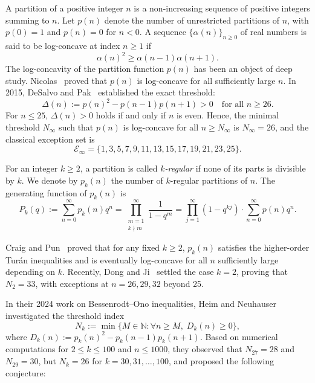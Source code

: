 \documentclass[11pt,reqno]{amsart}
\theoremstyle{definition}
\numberwithin{equation}{section}
\begin{document}
A partition of a positive integer $n$ is a non-increasing sequence of positive integers summing to $n$. Let $p(n)$ denote the number of unrestricted partitions of $n$, with $p(0) = 1$ and $p(n) = 0$ for $n < 0$. A sequence $\{\alpha(n)\}_{n \ge 0}$ of real numbers is said to be log-concave at index $n \ge 1$ if
\begin{equation}
\alpha(n)^2 \ge \alpha(n-1) \alpha(n+1).
\end{equation}
The log-concavity of the partition function $p(n)$ has been an object of deep study. Nicolas~\cite{Nicolas1978} proved that $p(n)$ is log-concave for all sufficiently large $n$. In 2015, DeSalvo and Pak~\cite{DeSalvoPak2015} established the exact threshold:
\begin{equation}
\Delta(n) := p(n)^2 - p(n-1) p(n+1) > 0 \quad \text{for all } n \ge 26.
\end{equation}
For $n \le 25$, $\Delta(n) > 0$ holds if and only if $n$ is even. Hence, the minimal threshold $N_\infty$ such that $p(n)$ is log-concave for all $n \ge N_\infty$ is $N_\infty = 26$, and the classical exception set is
\begin{equation}
\mathcal{E}_\infty = \{1, 3, 5, 7, 9, 11, 13, 15, 17, 19, 21, 23, 25\}.
\end{equation}

For an integer $k \ge 2$, a partition is called \emph{$k$-regular} if none of its parts is divisible by $k$. We denote by $p_k(n)$ the number of $k$-regular partitions of $n$. The generating function of $p_k(n)$ is
\begin{equation}
P_k(q) := \sum_{n=0}^\infty p_k(n) q^n = \prod_{\substack{m=1 \\ k \nmid m}}^\infty \frac{1}{1 - q^m} = \prod_{j=1}^\infty (1 - q^{kj}) \cdot \sum_{n=0}^\infty p(n) q^n.
\end{equation}

Craig and Pun~\cite{CraigPun2021} proved that for any fixed $k \ge 2$, $p_k(n)$ satisfies the higher-order Tur\'an inequalities and is eventually log-concave for all $n$ sufficiently large depending on $k$. Recently, Dong and Ji~\cite{DongJi2024} settled the case $k = 2$, proving that $N_2 = 33$, with exceptions at $n = 26, 29, 32$ beyond 25.

In their 2024 work on Bessenrodt--Ono inequalities, Heim and Neuhauser~\cite{HeimNeuhauser2024} investigated the threshold index
\begin{equation}
N_k := \min \{ M \in \mathbb{N} : \forall n \ge M, \; D_k(n) \ge 0 \},
\end{equation}
where $D_k(n) := p_k(n)^2 - p_k(n-1) p_k(n+1)$. Based on numerical computations for $2 \le k \le 100$ and $n \le 1000$, they observed that $N_{27} = 28$ and $N_{29} = 30$, but $N_k = 26$ for $k = 30, 31, \dots, 100$, and proposed the following conjecture:
\end{document}
